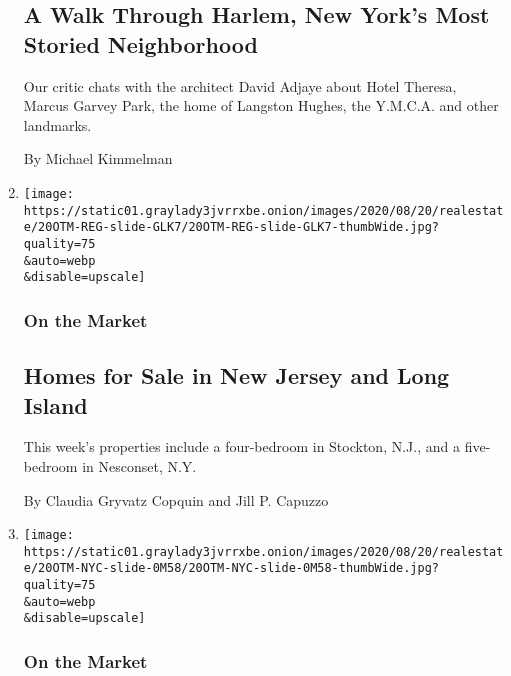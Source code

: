 \begin{enumerate}
  \hypertarget{a-walk-through-harlem-new-yorks-most-storied-neighborhood}{%
  \subsection{A Walk Through Harlem, New York's Most Storied
  Neighborhood}\label{a-walk-through-harlem-new-yorks-most-storied-neighborhood}}

  Our critic chats with the architect David Adjaye about Hotel Theresa,
  Marcus Garvey Park, the home of Langston Hughes, the Y.M.C.A. and
  other landmarks.

  By Michael Kimmelman
\item
  \href{/2020/08/20/realestate/homes-for-sale-in-new-jersey-and-long-island.html}{}

  \texttt{[image: https://static01.graylady3jvrrxbe.onion/images/2020/08/20/realestate/20OTM-REG-slide-GLK7/20OTM-REG-slide-GLK7-thumbWide.jpg?quality=75\\\&auto=webp\\\&disable=upscale]}

  \hypertarget{on-the-market}{%
  \subsubsection{On the Market}\label{on-the-market}}

  \hypertarget{homes-for-sale-in-new-jersey-and-long-island}{%
  \subsection{Homes for Sale in New Jersey and Long
  Island}\label{homes-for-sale-in-new-jersey-and-long-island}}

  This week's properties include a four-bedroom in Stockton, N.J., and a
  five-bedroom in Nesconset, N.Y.

  By Claudia Gryvatz Copquin and Jill P. Capuzzo
\item
  \href{/2020/08/20/realestate/homes-for-sale-in-brooklyn-manhattan-and-the-bronx.html}{}

  \texttt{[image: https://static01.graylady3jvrrxbe.onion/images/2020/08/20/realestate/20OTM-NYC-slide-0M58/20OTM-NYC-slide-0M58-thumbWide.jpg?quality=75\\\&auto=webp\\\&disable=upscale]}

  \hypertarget{on-the-market-1}{%
  \subsubsection{On the Market}\label{on-the-market-1}}

  \hypertarget{homes-for-sale-in-brooklyn-manhattan-and-the-bronx}{%
}
\end{enumerate}
